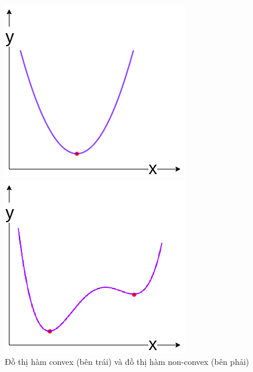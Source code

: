 \begin{figure}[!htb] 
   \begin{minipage}{0.48\textwidth}
     \centering
     \includegraphics[width=1\linewidth]{chapter02/figure/convex.png}
   \end{minipage}\hfill
   \begin{minipage}{0.48\textwidth}
     \centering
     \includegraphics[width=1\linewidth]{chapter02/figure/non_convex.png}
   \end{minipage}
   \caption{Đồ thị hàm convex (bên trái) và đồ thị hàm non-convex (bên phải)}
   \label{fig:convex}
\end{figure}

